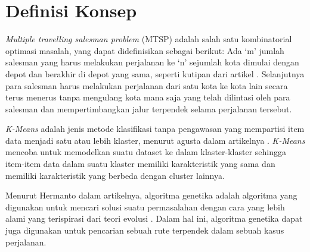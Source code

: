 \section{Definisi Konsep}

\textit{Multiple travelling salesman problem} (MTSP) adalah salah satu kombinatorial optimasi masalah, yang dapat didefinisikan sebagai berikut: Ada `m' jumlah salesman yang harus melakukan perjalanan ke `n' sejumlah kota dimulai dengan depot dan berakhir di depot yang sama, seperti kutipan dari artikel \cite{al2019comparative}. Selanjutnya para salesman harus melakukan perjalanan dari satu kota ke kota lain secara terus menerus tanpa mengulang kota mana saja yang telah dilintasi oleh para salesman dan mempertimbangkan jalur terpendek selama perjalanan tersebut.

\textit{K-Means} adalah jenis metode klasifikasi tanpa pengawasan yang mempartisi item data menjadi satu atau lebih klaster, menurut agusta dalam artikelnya \cite{agusta2007k}. \textit{K-Means} mencoba untuk memodelkan suatu dataset ke dalam klaster-klaster sehingga item-item data dalam suatu klaster memiliki karakteristik yang sama dan memiliki karakteristik yang berbeda dengan cluster lainnya.

Menurut Hermanto dalam artikelnya, algoritma genetika adalah algoritma yang digunakan untuk mencari solusi suatu permasalahan dengan cara yang lebih alami yang terispirasi dari teori evolusi  \cite{hermawanto2003algoritma}. Dalam hal ini, algoritma genetika dapat juga digunakan untuk pencarian sebuah rute terpendek dalam sebuah kasus perjalanan.
